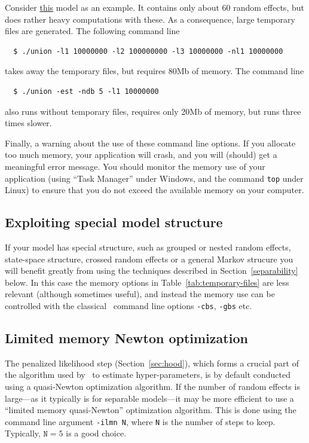 \documentclass{admbmanual}
\begin{document}
Consider \href{http://otter-rsch.com/admbre/examples/union/union.html}{this}
model as an example. It contains only about 60 random effects, but does rather
heavy computations with these. As a consequence, large temporary files are
generated. The following command line
\begin{lstlisting}
  $ ./union -l1 10000000 -l2 100000000 -l3 10000000 -nl1 10000000
\end{lstlisting}
takes away the temporary files, but requires 80Mb of memory. The command line
\begin{lstlisting}
  $ ./union -est -ndb 5 -l1 10000000
\end{lstlisting}
also runs without temporary files, requires only 20Mb of memory, but runs three
times slower.

Finally, a warning about the use of these command line options. If you allocate
too much memory, your application will crash, and you will (should) get a
meaningful error message. You should monitor the memory use of your application
(using ``Task Manager'' under Windows, and the command \texttt{top} under Linux)
to ensure that you do not exceed the available memory on your computer.

\subsection{Exploiting special model structure}
If your model has special structure, such as
grouped or nested random effects, state-space structure,
crossed random effects or a general Markov strucure
you will benefit greatly from using the techniques
described in Section~\ref{separability} below.
In this case the memory options in Table~\ref{tab:temporary-files}
are less relevant (although sometimes useful), and instead the
memory use can be controlled with the classical \ADM\ command line options
\texttt{-cbs}, \texttt{-gbs} etc.

\subsection{Limited memory Newton optimization}

The penalized likelihood step (Section~\ref{sec:hood}), which forms a crucial
part of the algorithm used by \scAB\ to estimate hyper-parameters, is by default
conducted using a quasi-Newton optimization algorithm. If the number of random
effects is large---as it typically is for separable models---it may be more
efficient to use a ``limited memory quasi-Newton'' optimization algorithm. This
is done using the command line argument \texttt{-ilmn N}, where \texttt{N} is
the number of steps to keep. Typically, $\texttt{N} = 5$ is a good choice.
\end{document}
